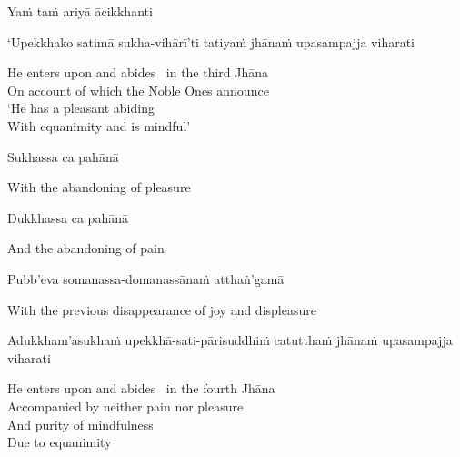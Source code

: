 Yaṁ taṁ ariyā ācikkhanti
\begin{pali-hang-together}
  `Upekkhako satimā sukha-vihārī'ti\ifdigital\makeatletter\hyperlink{endnote66-appendix}\makeatother \thinspace\fi
  tatiyaṁ jhānaṁ upasampajja viharati
\end{pali-hang-together}

\begin{english-verses}
  He enters upon and abides \breathmark\ in the third Jhāna\\
  On account of which the Noble Ones announce\\
  `He has a pleasant abiding\\
  With equanimity and is mindful'
\end{english-verses}

Sukhassa ca pahānā

\begin{english}
  With the abandoning of pleasure
\end{english}

Dukkhassa ca pahānā

\begin{english}
  And the abandoning of pain
\end{english}

Pubb'eva somanassa-domanassānaṁ atthaṅ'gamā

\begin{english}
  With the previous disappearance of joy and displeasure\ifdigital\makeatletter\hyperlink{endnote67-appendix}\makeatother\fi
\end{english}

\ifninebythirteen\clearpage\fi

\begin{pali-hang}
  Adukkham'asukhaṁ upekkhā-sati-pārisuddhiṁ catutthaṁ jhānaṁ upasampajja viharati
\end{pali-hang}

\begin{english-verses}
  He enters upon and abides \breathmark\ in the fourth Jhāna\\
  Accompanied by neither pain nor pleasure\\
  And purity of mindfulness\\
  Due to equanimity
\end{english-verses}

